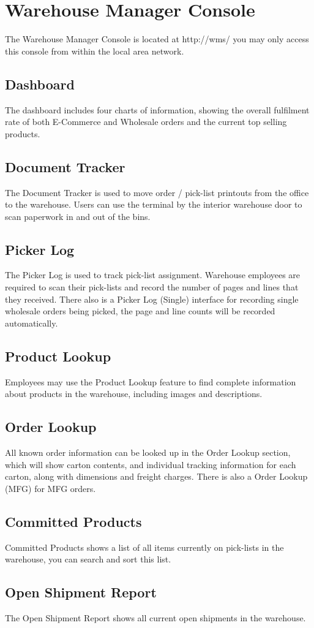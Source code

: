 \section{Warehouse Manager Console}

The Warehouse Manager Console is located at http://wms/ you may only access this console from within the local area network.

\subsection{Dashboard}

The dashboard includes four charts of information, showing the overall fulfilment rate of both E-Commerce and Wholesale orders and the current top selling products.

\subsection{Document Tracker}

The Document Tracker is used to move order / pick-list printouts from the office to the warehouse. Users can use the terminal by the interior warehouse door to scan paperwork in and out of the bins.

\subsection{Picker Log}

The Picker Log is used to track pick-list assignment.  Warehouse employees are required to scan their pick-lists and record the number of pages and lines that they received.  There also is a Picker Log (Single) interface for recording single wholesale orders being picked, the page and line counts will be recorded automatically.

\subsection{Product Lookup}

Employees may use the Product Lookup feature to find complete information about products in the warehouse, including images and descriptions.

\subsection{Order Lookup}

All known order information can be looked up in the Order Lookup section, which will show carton contents, and individual tracking information for each carton, along with dimensions and freight charges.  There is also a Order Lookup (MFG) for MFG orders.

\subsection{Committed Products}

Committed Products shows a list of all items currently on pick-lists in the warehouse, you can search and sort this list.

\subsection{Open Shipment Report}

The Open Shipment Report shows all current open shipments in the warehouse.
